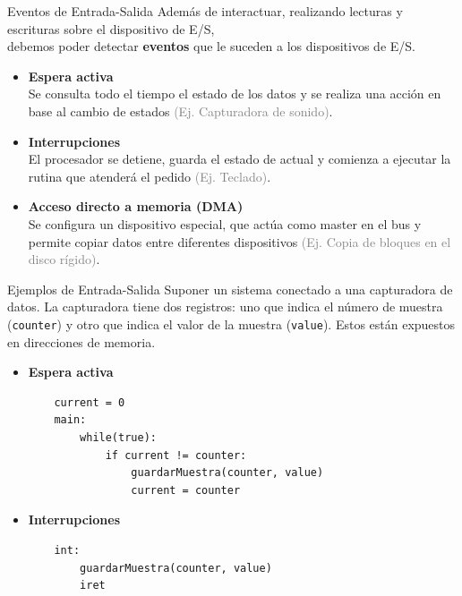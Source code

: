 \documentclass[aspectratio=169]{beamer}
\begin{document}
\begin{frame}[fragile]{Eventos de Entrada-Salida}
    Además de interactuar, realizando lecturas y escrituras sobre el dispositivo de E/S,\\
    debemos poder detectar \textbf{eventos} que le suceden a los dispositivos de E/S.
    \bigskip
    \begin{itemize}
    \setlength\itemsep{0.5cm}
    \item<1-> \textbf{Espera activa}\\
    Se consulta todo el tiempo el estado de los datos y se realiza una acción en base al cambio de estados
    \textcolor{gray}{(Ej. Capturadora de sonido)}.
    \item<2-> \textbf{Interrupciones}\\
    El procesador se detiene, guarda el estado de actual y comienza a ejecutar la rutina que atenderá el pedido
    \textcolor{gray}{(Ej. Teclado)}.
    \item<3-> \textbf{Acceso directo a memoria (DMA)}\\
    Se configura un dispositivo especial, que actúa como master en el bus y permite copiar datos entre diferentes dispositivos
    \textcolor{gray}{(Ej. Copia de bloques en el disco rígido)}.
    \end{itemize}
\end{frame}

\begin{frame}[fragile]{Ejemplos de Entrada-Salida}
    \small
    Suponer un sistema conectado a una capturadora de datos.
    La capturadora tiene dos registros: uno que indica el número de muestra (\texttt{counter}) y otro que indica el valor de la muestra (\texttt{value}).
    Estos están expuestos en direcciones de memoria.
    \begin{itemize}
    \item<2-> \textbf{Espera activa}\\
    \begin{verbatim}
    current = 0
    main:
        while(true):
            if current != counter:
                guardarMuestra(counter, value)
                current = counter
    \end{verbatim}
    \item<3-> \textbf{Interrupciones}\\
    \begin{verbatim}
    int:
        guardarMuestra(counter, value)
        iret
    \end{verbatim}
    \end{itemize}
\end{frame}
\end{document}
